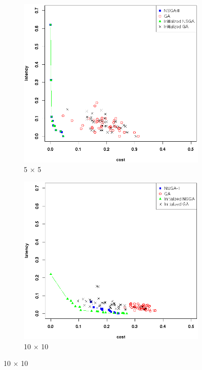 \documentclass{llncs}
\begin{document}
\begin{flushleft}
\begin{flushleft}
\begin{figure}[H]
\begin{subfigure}[b]{0.4\textwidth}
		\includegraphics[width=\textwidth]{pics/pop_50_gen_50_5_times_5_sufficient_initialisation.png}
		\caption{5 $\times$ 5}
	\end{subfigure}
	\begin{subfigure}[b]{0.4\textwidth}
		\includegraphics[width=\textwidth]{pics/pop_50_gen_50_10_times_10_sufficient_initialisation.png}
		\caption{10 $\times$ 10}

\end{subfigure}
\end{figure}
\end{flushleft}
\end{flushleft}
\end{document}
